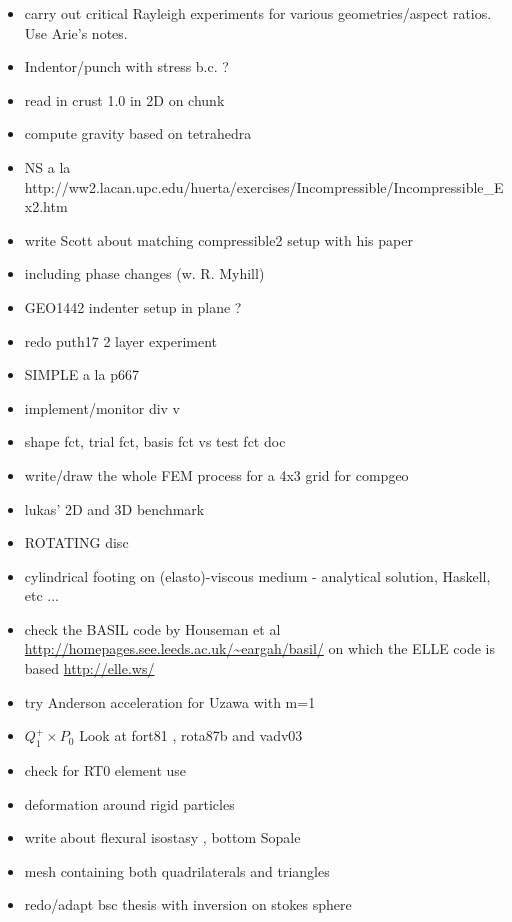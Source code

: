 \begin{itemize}
\item carry out critical Rayleigh experiments for various geometries/aspect ratios. Use Arie's notes. 
\item Indentor/punch with stress b.c. ?
\item read in crust 1.0 in 2D on chunk
\item compute gravity based on tetrahedra
\item NS a la http://ww2.lacan.upc.edu/huerta/exercises/Incompressible/Incompressible\_Ex2.htm
\item write Scott about matching compressible2 setup with his paper
\item including phase changes (w. R. Myhill)
\item GEO1442 indenter setup in plane ?
\item redo puth17 2 layer experiment
\item SIMPLE a la p667 \cite{john16} 
\item implement/monitor div v
\item shape fct, trial fct, basis fct vs test fct doc
\item write/draw the whole FEM process for a 4x3 grid for compgeo
\item lukas' 2D and 3D benchmark
\item ROTATING disc
\item cylindrical footing on (elasto)-viscous medium - analytical solution, Haskell, etc ...
\item check the BASIL code by Houseman et al \url{http://homepages.see.leeds.ac.uk/~eargah/basil/}
on which the ELLE code is based \url{http://elle.ws/} 
\item try Anderson acceleration for Uzawa \cite{hoow17} with m=1
\item $Q_1^+ \times P_0$ Look at fort81 , rota87b and vadv03
\item check \cite{bufm19} for RT0 element use
\item deformation around rigid particles \cite{ilma93}
\item write about flexural isostasy \cite{maie12}, bottom Sopale
\item mesh containing both quadrilaterals and triangles \cite{anbr80}
\item redo/adapt bsc thesis with inversion on stokes sphere

\end{itemize}
